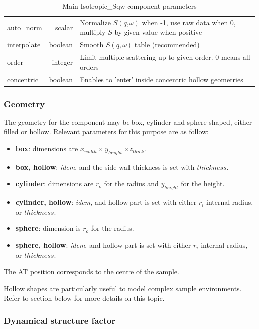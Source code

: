 \begin{table}
\begin{center}
{\begin{tabular}{|lr|p{}|}
auto\_norm& scalar  & Normalize $S(q,\omega)$ when -1, use raw data when 0, multiply $S$ by given value when positive \\
interpolate & boolean & Smooth $S(q,\omega)$ table (recommended) \\
order     & integer & Limit multiple scattering up to given order. 0 means all orders  \\
concentric& boolean & Enables to 'enter' inside concentric hollow geometries  \\
    \hline
    \end{tabular}
    \caption{Main Isotropic\_Sqw component parameters}
    \label{t:sqw-param}
  }
  \end{center}
\end{table}

\subsubsection{Geometry}

The geometry for the component may be box, cylinder and sphere shaped, either filled or hollow. Relevant parameters for this purpose are as follow:
\begin{itemize}
\item {\bf box}: dimensions are $x_{width} \times y_{height} \times z_{thick}$.
\item {\bf box, hollow}: \emph{idem}, and the side wall thickness is set with $thickness$.
\item {\bf cylinder}: dimensions are $r_o$ for the radius and $y_{height}$ for the height.
\item {\bf cylinder, hollow}: \emph{idem}, and hollow part is set with either $r_i$ internal radius, or $thickness$.
\item {\bf sphere}: dimension is $r_o$ for the radius.
\item {\bf sphere, hollow}: \emph{idem}, and hollow part is set with either $r_i$ internal radius, or $thickness$.
\end{itemize}
The AT position corresponds to the centre of the sample.

Hollow shapes are particularly useful to model complex sample environments. Refer to section below for more details on this topic.

\subsubsection{Dynamical structure factor}

